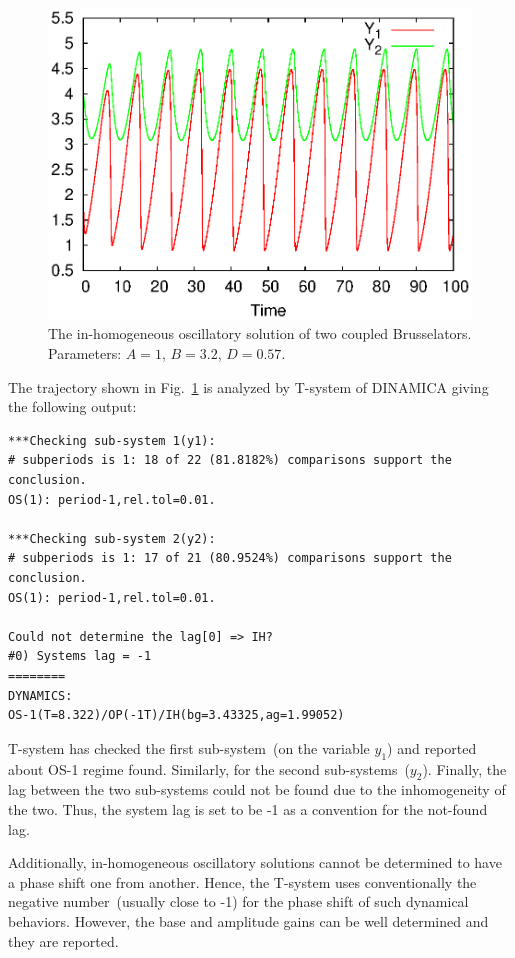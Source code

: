 \documentclass[11pt,a4paper]{article}
\begin{document}
\begin{figure}[h]
  \centering
  \includegraphics[scale=0.65]{br2_ihos}
  \caption{The in-homogeneous oscillatory solution of two coupled
    Brusselators. Parameters: $A=1$, $B=3.2$, $D=0.57$.}
  \label{fig:br2_ihos}
\end{figure}

The trajectory shown in Fig.~\ref{fig:br2_ihos} is analyzed by T-system of DINAMICA
giving the following output:
\begin{verbatim}
***Checking sub-system 1(y1):
# subperiods is 1: 18 of 22 (81.8182%) comparisons support the conclusion.
OS(1): period-1,rel.tol=0.01.

***Checking sub-system 2(y2):
# subperiods is 1: 17 of 21 (80.9524%) comparisons support the conclusion.
OS(1): period-1,rel.tol=0.01.

Could not determine the lag[0] => IH?
#0) Systems lag = -1
========
DYNAMICS:
OS-1(T=8.322)/OP(-1T)/IH(bg=3.43325,ag=1.99052)
\end{verbatim}

T-system has checked the first sub-system~(on the variable $y_1$) and reported about
OS-1 regime found. Similarly, for the second sub-systems~($y_2$). Finally, the lag
between the two sub-systems could not be found due to the inhomogeneity of the
two. Thus, the system lag is set to be -1 as a convention for the not-found
lag.

Additionally, in-homogeneous oscillatory solutions cannot be determined to have a
phase shift one from another. Hence, the T-system uses conventionally the negative
number~(usually close to -1) for the phase shift of such dynamical behaviors. However,
the base and amplitude gains can be well determined and they are reported.
\end{document}

